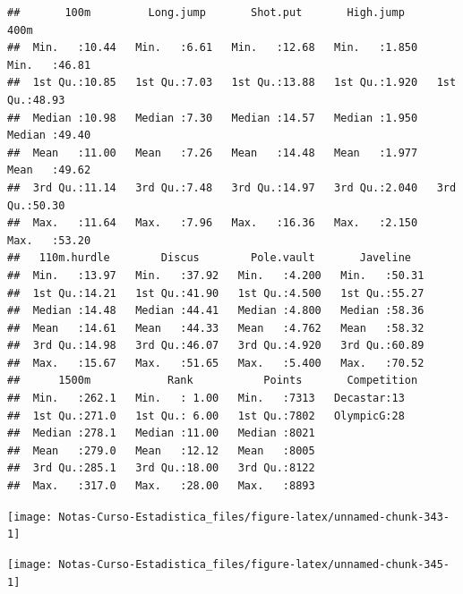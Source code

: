 \documentclass[
  12pt,
]{book}
\newenvironment{Shaded}{\begin{snugshade}}{\end{snugshade}}
\newcommand{\DecValTok}[1]{\textcolor[rgb]{0.00,0.00,0.81}{#1}}
\newcommand{\FunctionTok}[1]{\textcolor[rgb]{0.00,0.00,0.00}{#1}}
\newcommand{\NormalTok}[1]{#1}
\newcommand{\SpecialCharTok}[1]{\textcolor[rgb]{0.00,0.00,0.00}{#1}}
\begin{document}
\begin{verbatim}
##       100m         Long.jump       Shot.put       High.jump          400m      
##  Min.   :10.44   Min.   :6.61   Min.   :12.68   Min.   :1.850   Min.   :46.81  
##  1st Qu.:10.85   1st Qu.:7.03   1st Qu.:13.88   1st Qu.:1.920   1st Qu.:48.93  
##  Median :10.98   Median :7.30   Median :14.57   Median :1.950   Median :49.40  
##  Mean   :11.00   Mean   :7.26   Mean   :14.48   Mean   :1.977   Mean   :49.62  
##  3rd Qu.:11.14   3rd Qu.:7.48   3rd Qu.:14.97   3rd Qu.:2.040   3rd Qu.:50.30  
##  Max.   :11.64   Max.   :7.96   Max.   :16.36   Max.   :2.150   Max.   :53.20  
##   110m.hurdle        Discus        Pole.vault       Javeline    
##  Min.   :13.97   Min.   :37.92   Min.   :4.200   Min.   :50.31  
##  1st Qu.:14.21   1st Qu.:41.90   1st Qu.:4.500   1st Qu.:55.27  
##  Median :14.48   Median :44.41   Median :4.800   Median :58.36  
##  Mean   :14.61   Mean   :44.33   Mean   :4.762   Mean   :58.32  
##  3rd Qu.:14.98   3rd Qu.:46.07   3rd Qu.:4.920   3rd Qu.:60.89  
##  Max.   :15.67   Max.   :51.65   Max.   :5.400   Max.   :70.52  
##      1500m            Rank           Points       Competition
##  Min.   :262.1   Min.   : 1.00   Min.   :7313   Decastar:13  
##  1st Qu.:271.0   1st Qu.: 6.00   1st Qu.:7802   OlympicG:28  
##  Median :278.1   Median :11.00   Median :8021                
##  Mean   :279.0   Mean   :12.12   Mean   :8005                
##  3rd Qu.:285.1   3rd Qu.:18.00   3rd Qu.:8122                
##  Max.   :317.0   Max.   :28.00   Max.   :8893
\end{verbatim}

\begin{center}\texttt{[image: Notas-Curso-Estadistica\_files/figure-latex/unnamed-chunk-343-1]} \end{center}

\begin{center}\texttt{[image: Notas-Curso-Estadistica\_files/figure-latex/unnamed-chunk-345-1]} \end{center}

\begin{Shaded}
\end{Shaded}
\end{document}
